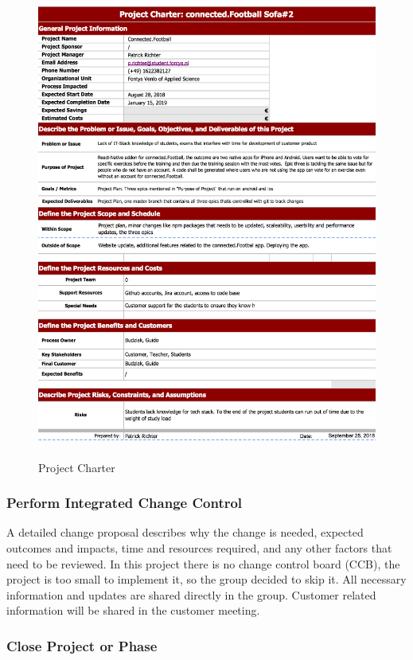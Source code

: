 \begin{figure}[H]
  \includegraphics[width=425px, height=585px]{images/projectChater.png}
  \caption{Project Charter}
  \label{fig:project_charter}
\end{figure}

\subsubsection{Perform Integrated Change Control}
\label{sssec:perform_integrated_change_control}

A detailed change proposal describes why the change is needed, expected outcomes and impacts, time and resources required, and any other factors that need to be reviewed. 
In this project there is no change control board (CCB), the project is too small to implement it, so the group decided to skip it. All necessary information and updates are shared directly in the group. Customer related information will be shared in the customer meeting.

\subsubsection{Close Project or Phase}
\label{sssec:close_project}

